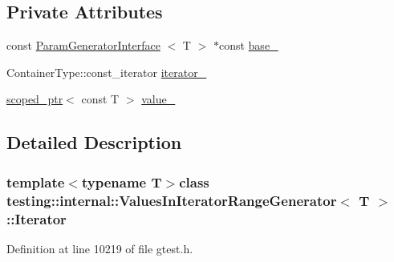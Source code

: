\subsection*{\-Private \-Attributes}
\begin{DoxyCompactItemize}
\item 
const \hyperlink{classtesting_1_1internal_1_1ParamGeneratorInterface}{\-Param\-Generator\-Interface}\*
$<$ \-T $>$ $\ast$const \hyperlink{classtesting_1_1internal_1_1ValuesInIteratorRangeGenerator_1_1Iterator_a93e2c6416427150cd20cce832f699e19}{base\-\_\-}
\item 
\-Container\-Type\-::const\-\_\-iterator \hyperlink{classtesting_1_1internal_1_1ValuesInIteratorRangeGenerator_1_1Iterator_afc82a44b2e40a4bd1804bf6b47540e52}{iterator\-\_\-}
\item 
\hyperlink{classtesting_1_1internal_1_1scoped__ptr}{scoped\-\_\-ptr}$<$ const \-T $>$ \hyperlink{classtesting_1_1internal_1_1ValuesInIteratorRangeGenerator_1_1Iterator_a40940c6bbac9357990c7a71bbeae1568}{value\-\_\-}
\end{DoxyCompactItemize}


\subsection{\-Detailed \-Description}
\subsubsection*{template$<$typename T$>$class testing\-::internal\-::\-Values\-In\-Iterator\-Range\-Generator$<$ T $>$\-::\-Iterator}



\-Definition at line 10219 of file gtest.\-h.



